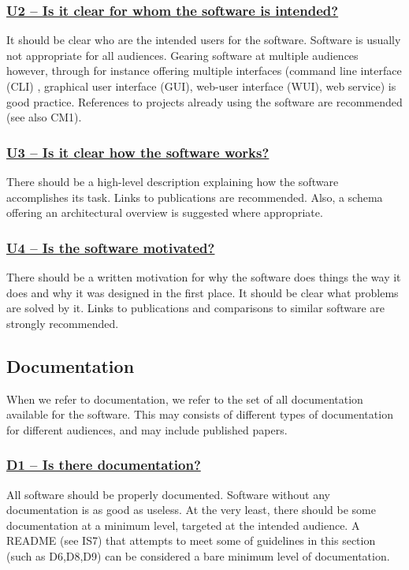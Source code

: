 \documentclass[a4paper,11pt]{article}
\newcommand{\indicator}[1]{\subsubsection*{\underline{#1}}}
\begin{document}
\indicator{U2 -- Is it clear for whom the software is intended?}

It should be clear who are the intended users for the software. Software is
usually not appropriate for all audiences. Gearing software at multiple
audiences however, through for instance offering multiple interfaces (command
line interface (CLI) , graphical user interface (GUI), web-user interface
(WUI), web service) is good practice. References to projects already using the
software are recommended (see also CM1).

\indicator{U3 -- Is it clear how the software works?}

There should be a high-level description explaining how the software
accomplishes its task. Links to publications are recommended. Also, a schema
offering an architectural overview is suggested where appropriate. 

\indicator{U4 -- Is the software motivated?}

There should be a written motivation for why the software does things the way
it does and why it was designed in the first place. It should be clear what
problems are solved by it. Links to publications and comparisons to similar
software are strongly recommended.

\subsection{Documentation}

When we refer to documentation, we refer to the set of all documentation
available for the software. This may consists of different types of
documentation for different audiences, and may include published papers.

\indicator{D1 -- Is there documentation?}

All software should be properly documented. Software without any documentation
is as good as useless. At the very least, there should be some documentation at
a minimum level, targeted at the intended audience. A README (see IS7) that
attempts to meet some of guidelines in this section (such as D6,D8,D9) can be
considered a bare minimum level of documentation.

%
%
%
\end{document}
